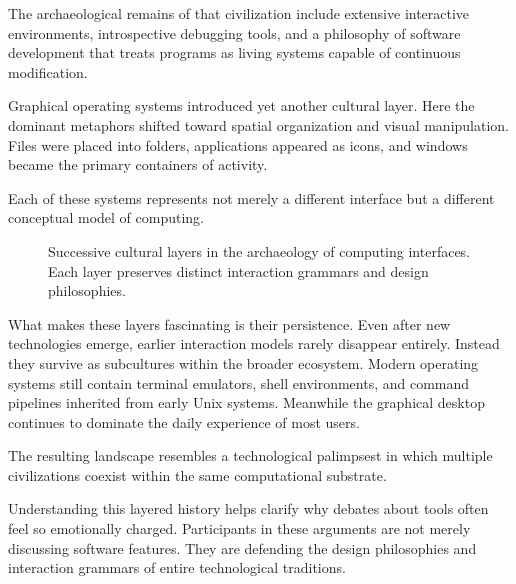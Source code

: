 \documentclass[11pt]{article}
\theoremstyle{definition}
\begin{document}
The archaeological remains of that civilization include extensive
interactive environments, introspective debugging tools, and a
philosophy of software development that treats programs as living
systems capable of continuous modification.

Graphical operating systems introduced yet another cultural layer.
Here the dominant metaphors shifted toward spatial organization and
visual manipulation. Files were placed into folders, applications
appeared as icons, and windows became the primary containers of
activity.

Each of these systems represents not merely a different interface but a
different conceptual model of computing.

\begin{figure}[h]
\centering
{}
\caption{Successive cultural layers in the archaeology of computing
interfaces. Each layer preserves distinct interaction grammars and
design philosophies.}
\label{fig:software_archaeology}
\end{figure}

What makes these layers fascinating is their persistence. Even after
new technologies emerge, earlier interaction models rarely disappear
entirely. Instead they survive as subcultures within the broader
ecosystem. Modern operating systems still contain terminal emulators,
shell environments, and command pipelines inherited from early Unix
systems. Meanwhile the graphical desktop continues to dominate the
daily experience of most users.

The resulting landscape resembles a technological palimpsest in which
multiple civilizations coexist within the same computational substrate.

Understanding this layered history helps clarify why debates about tools
often feel so emotionally charged. Participants in these arguments are
not merely discussing software features. They are defending the design
philosophies and interaction grammars of entire technological
traditions.
\end{document}
